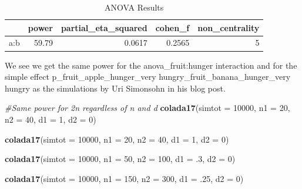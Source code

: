 \documentclass[]{book}
\newenvironment{Shaded}{\begin{snugshade}}{\end{snugshade}}
\newcommand{\CommentTok}[1]{\textcolor[rgb]{0.56,0.35,0.01}{\textit{#1}}}
\newcommand{\DataTypeTok}[1]{\textcolor[rgb]{0.13,0.29,0.53}{#1}}
\newcommand{\DecValTok}[1]{\textcolor[rgb]{0.00,0.00,0.81}{#1}}
\newcommand{\FloatTok}[1]{\textcolor[rgb]{0.00,0.00,0.81}{#1}}
\newcommand{\KeywordTok}[1]{\textcolor[rgb]{0.13,0.29,0.53}{\textbf{#1}}}
\newcommand{\NormalTok}[1]{#1}
\begin{document}
\begin{table}[!h]

\caption{\label{tab:unnamed-chunk-231}ANOVA Results}
\centering
\begin{tabular}{l|r|r|r|r}
\hline
  & power & partial\_eta\_squared & cohen\_f & non\_centrality\\
\hline
a:b & 59.79 & 0.0617 & 0.2565 & 5\\
\hline
\end{tabular}
\end{table}

We see we get the same power for the anova\_fruit:hunger interaction and for the simple effect p\_fruit\_apple\_hunger\_very hungry\_fruit\_banana\_hunger\_very hungry as the simulations by Uri Simonsohn in his blog post.

\begin{Shaded}
\begin{Highlighting}[]
\CommentTok{#Same power for 2n regardless of n and d}
\KeywordTok{colada17}\NormalTok{(}\DataTypeTok{simtot =} \DecValTok{10000}\NormalTok{, }\DataTypeTok{n1 =} \DecValTok{20}\NormalTok{, }\DataTypeTok{n2 =} \DecValTok{40}\NormalTok{, }\DataTypeTok{d1 =} \DecValTok{1}\NormalTok{, }\DataTypeTok{d2 =} \DecValTok{0}\NormalTok{)  }

\KeywordTok{colada17}\NormalTok{(}\DataTypeTok{simtot =} \DecValTok{10000}\NormalTok{, }\DataTypeTok{n1 =} \DecValTok{20}\NormalTok{, }\DataTypeTok{n2 =} \DecValTok{40}\NormalTok{, }\DataTypeTok{d1 =} \DecValTok{1}\NormalTok{, }\DataTypeTok{d2 =} \DecValTok{0}\NormalTok{) }
\end{Highlighting}
\end{Shaded}

\begin{Shaded}
\begin{Highlighting}[]
\KeywordTok{colada17}\NormalTok{(}\DataTypeTok{simtot =} \DecValTok{10000}\NormalTok{, }\DataTypeTok{n1 =} \DecValTok{50}\NormalTok{, }\DataTypeTok{n2 =} \DecValTok{100}\NormalTok{, }\DataTypeTok{d1 =} \FloatTok{.3}\NormalTok{, }\DataTypeTok{d2 =} \DecValTok{0}\NormalTok{)}
\end{Highlighting}
\end{Shaded}

\begin{Shaded}
\begin{Highlighting}[]
\KeywordTok{colada17}\NormalTok{(}\DataTypeTok{simtot =} \DecValTok{10000}\NormalTok{, }\DataTypeTok{n1 =} \DecValTok{150}\NormalTok{, }\DataTypeTok{n2 =} \DecValTok{300}\NormalTok{, }\DataTypeTok{d1 =} \FloatTok{.25}\NormalTok{, }\DataTypeTok{d2 =} \DecValTok{0}\NormalTok{)}
\end{Highlighting}
\end{Shaded}
\end{document}
